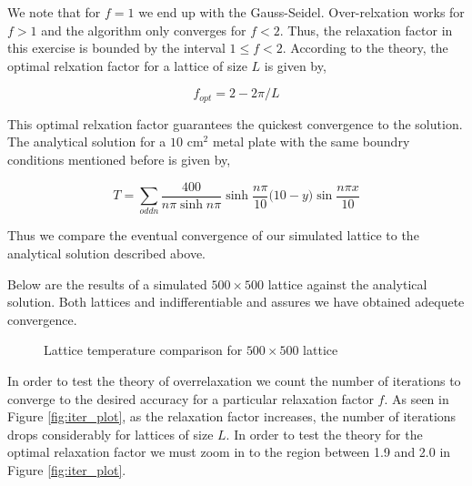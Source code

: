 \documentclass{article}
\begin{document}
We note that for $f = 1$ we end up with the Gauss-Seidel. Over-relxation works for $f > 1$ and the algorithm only converges for $f < 2$. Thus, the relaxation factor in this
exercise is bounded by the interval $1 \leq f < 2$. According to the theory, the optimal relxation factor for a lattice of size $L$ is given by,

\begin{equation}
\label{eq:f_opt}
  f_{opt} = 2 - 2\pi/L
\end{equation}

This optimal relxation factor guarantees the quickest convergence to the solution. The analytical solution for a $10\text{ cm}^2$ metal plate with the same
boundry conditions mentioned before is given by,

\begin{equation}
\label{eq:actual_t}
  T = \sum_{odd n} \frac{400}{n\pi \sinh{n\pi}}\sinh{\frac{n\pi}{10}\big(10 - y\big)}\sin{\frac{n\pi x}{10}}
\end{equation}

Thus we compare the eventual convergence of our simulated lattice to the analytical solution described above.

Below are the results of a simulated $ 500 \times 500$ lattice against the analytical solution. Both lattices and indifferentiable and assures we have
obtained adequete convergence.

\begin{figure}[H]
  \begin{center}
  \end{center}
  \caption{Lattice temperature comparison for $500 \times 500$ lattice}
  \label{fig:lattice_comp}
\end{figure}

In order to test the theory of overrelaxation we count the number of iterations to converge to the desired accuracy for
a particular relaxation factor $f$. As seen in Figure \ref{fig:iter_plot}, as the relaxation factor increases, the number
of iterations drops considerably for lattices of size $L$. In order to test the theory for the optimal relaxation factor we
must zoom in to the region between 1.9 and 2.0 in Figure \ref{fig:iter_plot}.
\end{document}
